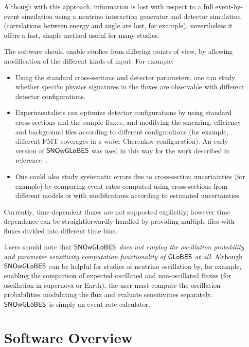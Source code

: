 \documentclass[12pt]{article}
\newcommand{\globes}{\sf{GLoBES}}
\newcommand{\snowglobes}{\sf{SNOwGLoBES}}
\begin{document}
Although with this approach, information is lost with respect to a
full event-by-event simulation using a neutrino interaction generator
and detector simulation (correlations between energy and angle are
lost, for example), nevertheless it offers a fast, simple method
useful for many studies.

The software should enable studies from differing points of view, by
allowing modification of the different kinds of input.  For example:

\begin{itemize}

\item Using the standard cross-sections and detector parameters, one
  can study whether specific physics signatures in the fluxes are observable
  with different detector configurations.

\item Experimentalists can optimize detector configurations by using
  standard cross-sections and the sample fluxes, and modifying the
  smearing, efficiency and background files according to different configurations
  (for example, different PMT coverages in a water Cherenkov configuration).  An early version of $\snowglobes$ was used in this way for the work described in reference~\cite{pwgstudy}.

\item 
One could also study systematic errors due to cross-section
uncertainties (for example) by comparing event rates computed using cross-sections
from different models or with modifications according to estimated
uncertainties.

\end{itemize}

Currently, time-dependent fluxes are not supported explicitly; however
time dependence can be straightforwardly handled by providing multiple
files with fluxes divided into different time bins.

Users should note that \textit{$\snowglobes$ does not employ the oscillation probability and parameter sensitivity computation functionality of $\globes$ at all}.  Although $\snowglobes$ can be helpful for studies of neutrino oscillation by, for example, enabling the comparison of expected  oscillated and non-oscillated fluxes (for oscillation in supernova or Earth), the user must compute the oscillation probabilities modulating the flux and evaluate sensitivities separately.
$\snowglobes$ is simply an event rate calculator.

\section{Software Overview}
\end{document}
